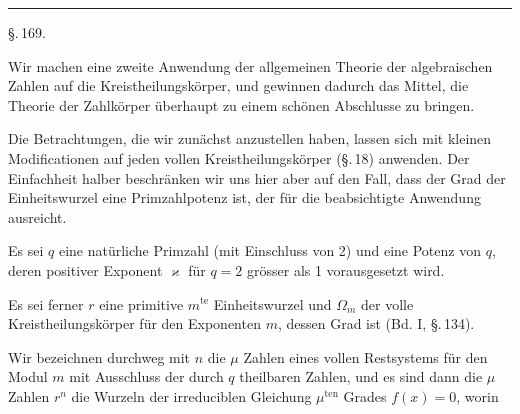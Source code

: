 
\begin{center}

\end{center}

\begin{center}
\rule{4cm}{0.4pt}
\end{center}

\begin{center}
\S.\,169.

\end{center}

Wir machen eine zweite Anwendung der allgemeinen Theorie der algebraischen Zahlen auf die Kreistheilungsk\"orper, und gewinnen dadurch das Mittel, die Theorie der  Zahlk\"orper \"uberhaupt zu einem sch\"onen Abschlusse zu bringen.

Die Betrachtungen, die wir zun\"achst anzustellen haben, lassen sich mit kleinen Modificationen auf jeden vollen Kreistheilungsk\"orper (\S.\,18) anwenden. Der Einfachheit halber beschr\"anken wir uns hier aber auf den Fall, dass der Grad der Einheitswurzel eine Primzahlpotenz ist, der f\"ur die beabsichtigte Anwendung ausreicht.

Es sei $q$ eine nat\"urliche Primzahl (mit Einschluss von 2) und
eine Potenz von $q$, deren positiver Exponent $\varkappa$ f\"ur $q=2$ gr\"osser als 1 vorausgesetzt wird.

Es sei ferner $r$ eine primitive $m^{\text{te}}$ Einheitswurzel und $\Omega_m$ der volle Kreistheilungsk\"orper f\"ur den Exponenten $m$, dessen Grad
ist (Bd. I, \S.\,134).

Wir bezeichnen durchweg mit $n$ die $\mu$ Zahlen eines vollen Restsystems f\"ur den Modul $m$ mit Ausschluss der durch $q$ theilbaren Zahlen, und es sind dann die $\mu$ Zahlen $r^n$ die Wurzeln der irreduciblen Gleichung $\mu^{\text{ten}}$ Grades $f(x)=0$, worin
